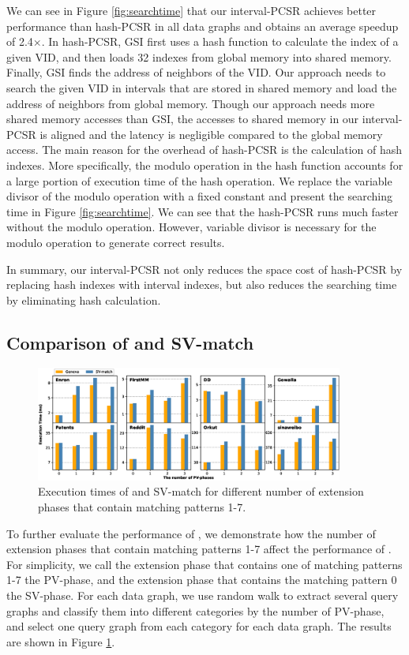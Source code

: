 We can see in Figure \ref{fig:searchtime} that our interval-PCSR achieves better performance than hash-PCSR in all data graphs and obtains
an average speedup of 2.4$\times$. In hash-PCSR, GSI first uses a hash function to calculate the index of a given VID, and then loads 32
indexes from global memory into shared memory. Finally, GSI finds the address of neighbors of the VID. Our approach needs to search the
given VID in intervals that are stored in shared memory and load the address of neighbors from global memory. Though our approach needs
more shared memory accesses than GSI, the accesses to shared memory in our interval-PCSR is aligned and the latency is negligible compared
to the global memory access. The main reason for the overhead of hash-PCSR is the calculation of hash indexes. More specifically, the
modulo operation in the hash function accounts for a large portion of execution time of the hash operation. We replace the variable divisor
of the modulo operation with a fixed constant and present the searching time in Figure \ref{fig:searchtime}. We can see that the hash-PCSR
runs much faster without the modulo operation. However, variable divisor is necessary for the modulo operation to generate correct results.

In summary, our interval-PCSR not only reduces the space cost of hash-PCSR by replacing hash indexes with interval indexes, but also
reduces the searching time by eliminating hash calculation.


\subsection{Comparison of \SystemName and SV-match\label{sec:comparesv}}
\begin{figure}
\centering
\includegraphics[width=0.9\textwidth]{./figure/compareSV.eps}
\caption{Execution times of \SystemName and SV-match for different number of extension phases that contain matching patterns 1-7.}	
\label{fig:compareSV}
\end{figure}
To further evaluate the performance of \SystemName, we demonstrate how the number of extension phases that contain matching patterns 1-7 affect the performance of \SystemName. For simplicity, we call the extension phase that contains one of matching patterns 1-7 the PV-phase, and the extension phase that contains the matching pattern 0 the SV-phase. For each data graph, we use random walk to extract several query graphs and classify them into different categories by the number of PV-phase, and select one query graph from each category for each data graph. The results are shown in Figure \ref{fig:compareSV}.


